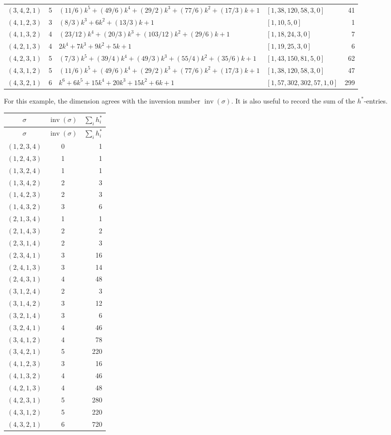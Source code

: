 \documentclass[11pt]{article}
\begin{document}
\begin{longtable}{c c >{\raggedright\arraybackslash}p{} >{\raggedright\arraybackslash}p{} r}
$(3,4,2,1)$ & 5 & $(11/6)k^5 + (49/6)k^4 + (29/2)k^3 + (77/6)k^2 + (17/3)k + 1$ & $[1,38,120,58,3,0]$ & 41 \\
$(4,1,2,3)$ & 3 & $(8/3)k^3 + 6k^2 + (13/3)k + 1$ & $[1,10,5,0]$ & 1 \\
$(4,1,3,2)$ & 4 & $(23/12)k^4 + (20/3)k^3 + (103/12)k^2 + (29/6)k + 1$ & $[1,18,24,3,0]$ & 7 \\
$(4,2,1,3)$ & 4 & $2k^4 + 7k^3 + 9k^2 + 5k + 1$ & $[1,19,25,3,0]$ & 6 \\
$(4,2,3,1)$ & 5 & $(7/3)k^5 + (39/4)k^4 + (49/3)k^3 + (55/4)k^2 + (35/6)k + 1$ & $[1,43,150,81,5,0]$ & 62 \\
$(4,3,1,2)$ & 5 & $(11/6)k^5 + (49/6)k^4 + (29/2)k^3 + (77/6)k^2 + (17/3)k + 1$ & $[1,38,120,58,3,0]$ & 47 \\
$(4,3,2,1)$ & 6 & $k^6 + 6k^5 + 15k^4 + 20k^3 + 15k^2 + 6k + 1$ & $[1,57,302,302,57,1,0]$ & 299 \\
\end{longtable}

For this example, the dimension agrees with the inversion number
$\operatorname{inv}(\sigma)$.  It is also useful to record the sum of the
$h^*$-entries.

\begin{longtable}{c c r}
\toprule
$\sigma$ & $\operatorname{inv}(\sigma)$ & $\sum_i h_i^*$ \\
\midrule
\endfirsthead
\toprule
$\sigma$ & $\operatorname{inv}(\sigma)$ & $\sum_i h_i^*$ \\
\midrule
\endhead
\bottomrule
\endfoot
$(1,2,3,4)$ & 0 & 1 \\
$(1,2,4,3)$ & 1 & 1 \\
$(1,3,2,4)$ & 1 & 1 \\
$(1,3,4,2)$ & 2 & 3 \\
$(1,4,2,3)$ & 2 & 3 \\
$(1,4,3,2)$ & 3 & 6 \\
$(2,1,3,4)$ & 1 & 1 \\
$(2,1,4,3)$ & 2 & 2 \\
$(2,3,1,4)$ & 2 & 3 \\
$(2,3,4,1)$ & 3 & 16 \\
$(2,4,1,3)$ & 3 & 14 \\
$(2,4,3,1)$ & 4 & 48 \\
$(3,1,2,4)$ & 2 & 3 \\
$(3,1,4,2)$ & 3 & 12 \\
$(3,2,1,4)$ & 3 & 6 \\
$(3,2,4,1)$ & 4 & 46 \\
$(3,4,1,2)$ & 4 & 78 \\
$(3,4,2,1)$ & 5 & 220 \\
$(4,1,2,3)$ & 3 & 16 \\
$(4,1,3,2)$ & 4 & 46 \\
$(4,2,1,3)$ & 4 & 48 \\
$(4,2,3,1)$ & 5 & 280 \\
$(4,3,1,2)$ & 5 & 220 \\
$(4,3,2,1)$ & 6 & 720 \\
\end{longtable}
\end{document}
